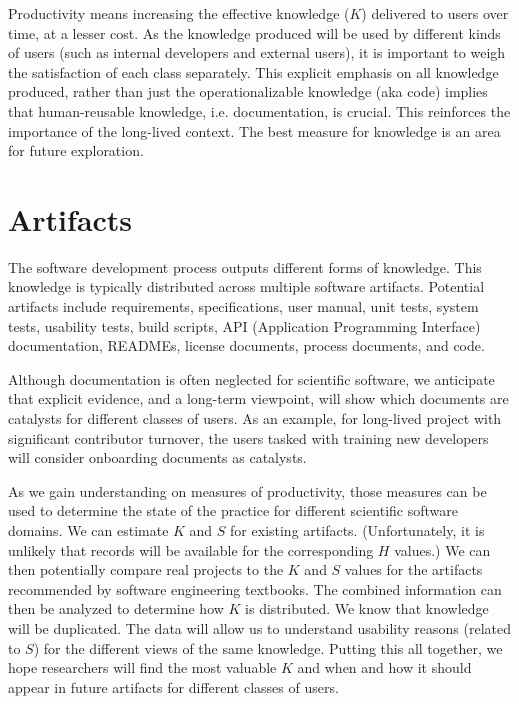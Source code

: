 \documentclass[sigconf, authorversion, nonacm]{acmart}
\begin{document}
Productivity means increasing the effective knowledge ($K$) delivered to users
over time, at a lesser cost. As the knowledge produced will be used by different
kinds of users (such as internal developers and external users), it is important
to weigh the satisfaction of each class separately. This explicit emphasis on
all knowledge produced, rather than just the operationalizable knowledge (aka
code) implies that human-reusable knowledge, i.e. documentation, is crucial.
This reinforces the importance of the long-lived context.  The best measure for
knowledge is an area for future exploration.






\section{Artifacts}

The software development process outputs different forms of knowledge. This
knowledge is typically distributed across multiple software artifacts.
Potential artifacts include requirements, specifications, user manual, unit
tests, system tests, usability tests, build scripts, API (Application
Programming Interface) documentation, READMEs, license documents, process
documents, and code.

Although documentation is often neglected for scientific software, we anticipate
that explicit evidence, and a long-term viewpoint, will show which documents are
catalysts for different classes of users.  As an example, for long-lived project
with significant contributor turnover, the users tasked with training new
developers will consider onboarding documents as catalysts.

As we gain understanding on measures of productivity, those measures can be used
to determine the state of the practice for different scientific software
domains. We can estimate $K$ and $S$ for existing artifacts. (Unfortunately, it
is unlikely that records will be available for the corresponding $H$ values.) We
can then potentially compare real projects to the $K$ and $S$ values for the
artifacts recommended by software engineering textbooks.  The combined
information can then be analyzed to determine how $K$ is distributed.  We know
that knowledge will be duplicated.  The data will allow us to understand
usability reasons (related to $S$) for the different views of the same
knowledge.  Putting this all together, we hope researchers will find the most
valuable $K$ and when and how it should appear in future artifacts for different
classes of users.
\end{document}
